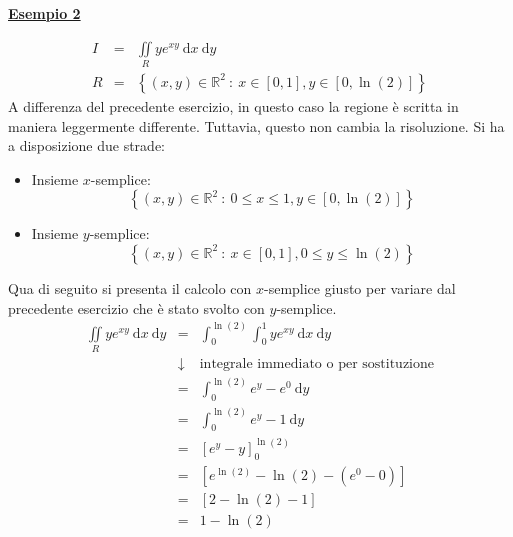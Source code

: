\documentclass[a4paper]{article}
\newcommand{\example}[1]{\textcolor{Green4}{\textbf{#1}}}
\begin{document}
	\begin{flushleft}
		\example{\underline{Esempio 2}}
	\end{flushleft}
	\begin{equation*}
		\begin{array}{rcl}
			I &=& \displaystyle\iint \limits_{R} ye^{xy} \: \mathrm{d}x \: \mathrm{d}y \\ [1.5em]
			R &=& \left\{\left(x,y\right) \in \mathbb{R}^{2} \: : \: x \in \left[0,1\right], y\in\left[0,\ln\left(2\right)\right]\right\}
		\end{array}
	\end{equation*}
	A differenza del precedente esercizio, in questo caso la regione è scritta in maniera leggermente differente. Tuttavia, questo non cambia la risoluzione. Si ha a disposizione due strade:
	\begin{itemize}
		\item Insieme $x$-semplice:
		\begin{equation*}
			\left\{\left(x,y\right) \in \mathbb{R}^{2} \: : \: 0 \le x \le 1, y\in\left[0,\ln\left(2\right)\right]\right\}
		\end{equation*}

		\item Insieme $y$-semplice:
		\begin{equation*}
			\left\{\left(x,y\right) \in \mathbb{R}^{2} \: : \: x \in \left[0,1\right], 0 \le y \le \ln\left(2\right) \right\}
		\end{equation*}
	\end{itemize}
	Qua di seguito si presenta il calcolo con $x$-semplice giusto per variare dal precedente esercizio che è stato svolto con $y$-semplice.
	\begin{equation*}
		\begin{array}{rcl}
			\displaystyle\iint \limits_{R} ye^{xy} \: \mathrm{d}x \: \mathrm{d}y 
			&=&
			\displaystyle \int_{0}^{\ln\left(2\right)} \int_{0}^{1} ye^{xy} \: \mathrm{d}x\:\mathrm{d}y \\ [1.5em]
			&\downarrow& \text{integrale immediato o per sostituzione} \\ [1em]
			&=&
			\displaystyle \int_{0}^{\ln\left(2\right)} e^{y}-e^{0} \:\mathrm{d}y \\ [1.5em]
			&=&
			\displaystyle \int_{0}^{\ln\left(2\right)} e^{y}-1 \:\mathrm{d}y \\ [1.5em]
			&=&
			\left[e^{y} - y\right]_{0}^{\ln\left(2\right)} \\ [1.5em]
			&=&
			\left[e^{\ln\left(2\right)} - \ln\left(2\right) - \left(e^{0} - 0\right)\right] \\ [1.5em]
			&=&
			\left[2 - \ln\left(2\right) - 1\right] \\ [1.5em]
			&=&
			1 - \ln\left(2\right)
		\end{array}
	\end{equation*}
\end{document}
